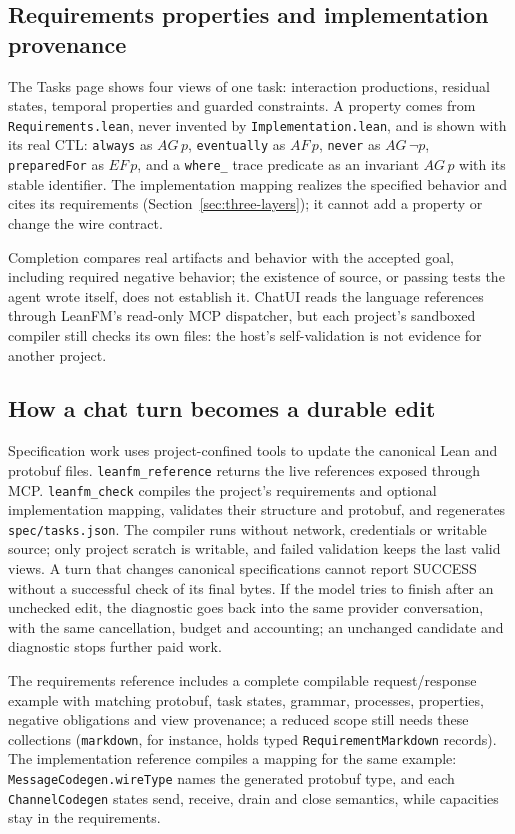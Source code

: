 \subsection{Requirements properties and implementation provenance}

The Tasks page shows four views of one task: interaction productions, residual
states, temporal properties and guarded constraints. A property comes from
\texttt{Requirements.lean}, never invented by \texttt{Implementation.lean}, and
is shown with its real CTL: \texttt{always} as $AG\,p$, \texttt{eventually} as
$AF\,p$, \texttt{never} as $AG\,\neg p$, \texttt{preparedFor} as $EF\,p$, and a
\texttt{where\_} trace predicate as an invariant $AG\,p$ with its stable
identifier. The implementation mapping realizes the specified behavior and cites
its requirements (Section~\ref{sec:three-layers}); it cannot add a property or
change the wire contract.

Completion compares real artifacts and behavior with the accepted goal,
including required negative behavior; the existence of source, or passing tests
the agent wrote itself, does not establish it. ChatUI reads the language
references through LeanFM's read-only MCP dispatcher, but each project's
sandboxed compiler still checks its own files: the host's self-validation is not
evidence for another project.

\subsection{How a chat turn becomes a durable edit}
\label{subsec:chat-turn-durable-edit}

Specification work uses project-confined tools to update the canonical Lean and
protobuf files. \texttt{leanfm\_reference} returns the live references exposed
through MCP. \texttt{leanfm\_check} compiles the project's requirements and
optional implementation mapping, validates their structure and protobuf, and
regenerates \texttt{spec/tasks.json}. The compiler runs without network,
credentials or writable source; only project scratch is writable, and failed
validation keeps the last valid views. A turn that changes canonical
specifications cannot report SUCCESS without a successful check of its final
bytes. If the model tries to finish after an unchecked edit, the diagnostic goes
back into the same provider conversation, with the same cancellation, budget and
accounting; an unchanged candidate and diagnostic stops further paid work.

The requirements reference includes a complete compilable request/response
example with matching protobuf, task states, grammar, processes, properties,
negative obligations and view provenance; a reduced scope still needs these
collections (\texttt{markdown}, for instance, holds typed
\texttt{RequirementMarkdown} records). The implementation reference compiles a
mapping for the same example: \texttt{MessageCodegen.wireType} names the
generated protobuf type, and each \texttt{ChannelCodegen} states send, receive,
drain and close semantics, while capacities stay in the requirements.

